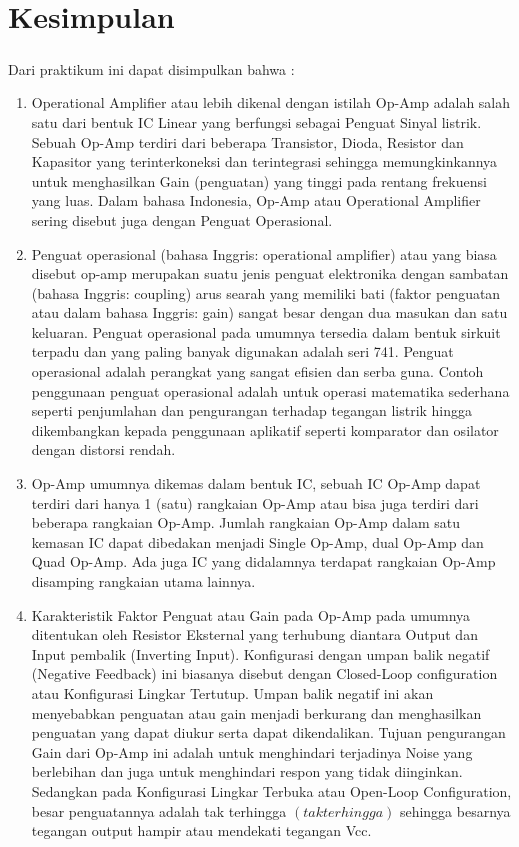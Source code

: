 \documentclass[12pt,a4paper]{article}
\begin{document}
\section{Kesimpulan}
\subparagraph{ }
Dari praktikum ini dapat disimpulkan bahwa :
\begin{enumerate}

\item Operational Amplifier atau lebih dikenal dengan istilah Op-Amp adalah salah satu dari bentuk IC Linear yang berfungsi sebagai Penguat Sinyal listrik. Sebuah Op-Amp terdiri dari beberapa Transistor, Dioda, Resistor dan Kapasitor yang terinterkoneksi dan terintegrasi sehingga memungkinkannya untuk menghasilkan Gain (penguatan) yang tinggi pada rentang frekuensi yang luas. Dalam bahasa Indonesia, Op-Amp atau Operational Amplifier sering disebut juga dengan Penguat Operasional.

\item Penguat operasional (bahasa Inggris: operational amplifier) atau yang biasa disebut op-amp merupakan suatu jenis penguat elektronika dengan sambatan (bahasa Inggris: coupling) arus searah yang memiliki bati (faktor penguatan atau dalam bahasa Inggris: gain) sangat besar dengan dua masukan dan satu keluaran. Penguat operasional pada umumnya tersedia dalam bentuk sirkuit terpadu dan yang paling banyak digunakan adalah seri 741.
Penguat operasional adalah perangkat yang sangat efisien dan serba guna. Contoh penggunaan penguat operasional adalah untuk operasi matematika sederhana seperti penjumlahan dan pengurangan terhadap tegangan listrik hingga dikembangkan kepada penggunaan aplikatif seperti komparator dan osilator dengan distorsi rendah.

\item Op-Amp umumnya dikemas dalam bentuk IC, sebuah IC Op-Amp dapat terdiri dari hanya 1 (satu) rangkaian Op-Amp atau bisa juga terdiri dari beberapa rangkaian Op-Amp. Jumlah rangkaian Op-Amp dalam satu kemasan IC dapat dibedakan menjadi Single Op-Amp, dual Op-Amp dan Quad Op-Amp. Ada juga IC yang didalamnya terdapat rangkaian Op-Amp disamping rangkaian utama lainnya.

\item Karakteristik Faktor Penguat atau Gain pada Op-Amp pada umumnya ditentukan oleh Resistor Eksternal yang terhubung diantara Output dan Input pembalik (Inverting Input). Konfigurasi dengan umpan balik negatif (Negative Feedback) ini biasanya disebut dengan Closed-Loop configuration atau Konfigurasi Lingkar Tertutup. Umpan balik negatif ini akan menyebabkan penguatan atau gain menjadi berkurang dan menghasilkan penguatan yang dapat diukur serta dapat dikendalikan. Tujuan pengurangan Gain dari Op-Amp ini adalah untuk menghindari terjadinya Noise yang berlebihan dan juga untuk menghindari respon yang tidak diinginkan. Sedangkan pada Konfigurasi Lingkar Terbuka atau Open-Loop Configuration, besar penguatannya adalah tak terhingga $(tak terhingga)$ sehingga besarnya tegangan output hampir atau mendekati tegangan Vcc.

\end{enumerate}
\end{document}
